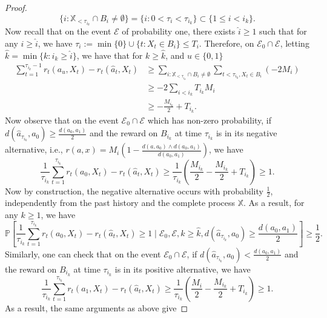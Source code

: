 \documentclass[aos]{imsart}
\theoremstyle{plain}
\theoremstyle{remark}
\newcommand{\Ecal}{\mathcal{E}}
\newcommand{\Pbb}{\mathbb{P}}
\newcommand{\Xbb}{\mathbb{X}}
\newcommand{\1}{\mathbbm{1}}%
\begin{document}
\begin{proof}
\begin{equation*}
    \{i: \Xbb_{<\tau_{i_k}}\cap B_i\neq\emptyset\} = \{i: 0<\tau_i<\tau_{i_k}\} \subset \{1\leq i< i_k\}.
\end{equation*}
Now recall that on the event $\Ecal$ of probability one, there exists $\hat i\geq 1$ such that for any $i\geq \hat i$, we have $\tau_i:=\min\{0\}\cup\{t:X_t\in B_i\} \leq T_i$. Therefore, on $\Ecal_0\cap\Ecal$, letting $\hat k=\min\{k:i_k\geq\hat i\}$, we have that for $k\geq \hat k$, and $u\in\{0,1\}$
\begin{align*}
    \sum_{t=1}^{\tau_{i_k}-1} r_t(a_u, X_t) - r_t(\hat a_t, X_t) &\geq \sum_{i: \Xbb_{<\tau_{i_k}}\cap B_i\neq\emptyset}\sum_{t<\tau_{i_k},X_t\in B_i} (-2M_i)\\
    &\geq -2\sum_{i<i_k} T_{i_k} M_i \\
    &\geq -\frac{M_{i_k}}{2} + T_{i_k}.
\end{align*}
Now observe that on the event $\Ecal_0\cap\Ecal$ which has non-zero probability, if $d(\hat a_{\tau_{i_k}},a_0) \geq \frac{d(a_0,a_1)}{2}$ and the reward on $B_{i_k}$ at time $\tau_{i_k}$ is in its negative alternative, i.e., $r(a, x) = M_i\left(1- \frac{d(a,a_0)\wedge d(a_0,a_1)}{d(a_0,a_1)}\right)$, we have
\begin{equation*}
    \frac{1}{\tau_{i_k}}\sum_{t=1}^{\tau_{i_k}} r_t(a_0, X_t) - r_t(\hat a_t, X_t) \geq \frac{1}{\tau_{i_k}}\left(\frac{M_{i_k}}{2}-\frac{M_{i_k}}{2} + T_{i_k}\right) \geq 1.
\end{equation*}
Now by construction, the negative alternative occurs with probability $\frac{1}{2}$, independently from the past history and the complete process $\Xbb$. As a result, for any $k\geq 1$, we have
\begin{equation}\label{eq:bad_event1}
    \Pbb\left[\frac{1}{\tau_{i_k}}\sum_{t=1}^{\tau_{i_k}} r_t(a_0, X_t) - r_t(\hat a_t, X_t) \geq 1 \mid \Ecal_0,\Ecal, k\geq \hat k,d(\hat a_{\tau_{i_k}},a_0) \geq \frac{d(a_0,a_1)}{2} \right] \geq \frac{1}{2}.
\end{equation}
Similarly, one can check that on the event $\Ecal_0\cap\Ecal$, if $d(\hat a_{\tau_{i_k}},a_0) < \frac{d(a_0,a_1)}{2}$ and the reward on $B_{i_k}$ at time $\tau_{i_k}$ is in its positive alternative, we have
\begin{equation*}
    \frac{1}{\tau_{i_k}}\sum_{t=1}^{\tau_{i_k}} r_t(a_1, X_t) - r_t(\hat a_t, X_t) \geq \frac{1}{\tau_{i_k}}\left(\frac{M_i}{2}-\frac{M_{i_k}}{2} + T_{i_k} \right) \geq 1.
\end{equation*}
As a result, the same arguments as above give

\end{proof}
\end{document}
